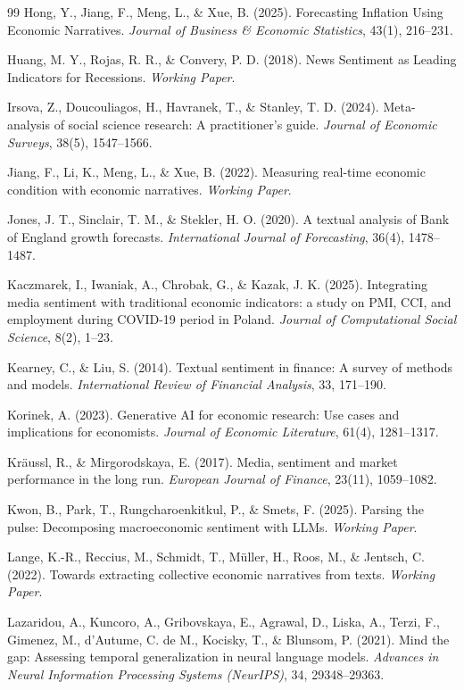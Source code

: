 \documentclass[11pt,twocolumn]{article}
\begin{document}
\begin{thebibliography}{99}
 Hong, Y., Jiang, F., Meng, L., \& Xue, B. (2025). Forecasting Inflation Using Economic Narratives. \textit{Journal of Business \& Economic Statistics}, 43(1), 216--231.

 Huang, M. Y., Rojas, R. R., \& Convery, P. D. (2018). News Sentiment as Leading Indicators for Recessions. \textit{Working Paper}.

 Irsova, Z., Doucouliagos, H., Havranek, T., \& Stanley, T. D. (2024). Meta-analysis of social science research: A practitioner's guide. \textit{Journal of Economic Surveys}, 38(5), 1547--1566.

 Jiang, F., Li, K., Meng, L., \& Xue, B. (2022). Measuring real-time economic condition with economic narratives. \textit{Working Paper}.

 Jones, J. T., Sinclair, T. M., \& Stekler, H. O. (2020). A textual analysis of Bank of England growth forecasts. \textit{International Journal of Forecasting}, 36(4), 1478--1487.

 Kaczmarek, I., Iwaniak, A., Chrobak, G., \& Kazak, J. K. (2025). Integrating media sentiment with traditional economic indicators: a study on PMI, CCI, and employment during COVID-19 period in Poland. \textit{Journal of Computational Social Science}, 8(2), 1--23.

 Kearney, C., \& Liu, S. (2014). Textual sentiment in finance: A survey of methods and models. \textit{International Review of Financial Analysis}, 33, 171--190.

 Korinek, A. (2023). Generative AI for economic research: Use cases and implications for economists. \textit{Journal of Economic Literature}, 61(4), 1281--1317.

 Kr\"aussl, R., \& Mirgorodskaya, E. (2017). Media, sentiment and market performance in the long run. \textit{European Journal of Finance}, 23(11), 1059--1082.

 Kwon, B., Park, T., Rungcharoenkitkul, P., \& Smets, F. (2025). Parsing the pulse: Decomposing macroeconomic sentiment with LLMs. \textit{Working Paper}.

 Lange, K.-R., Reccius, M., Schmidt, T., M\"uller, H., Roos, M., \& Jentsch, C. (2022). Towards extracting collective economic narratives from texts. \textit{Working Paper}.

 Lazaridou, A., Kuncoro, A., Gribovskaya, E., Agrawal, D., Liska, A., Terzi, F., Gimenez, M., d'Autume, C. de M., Kocisky, T., \& Blunsom, P. (2021). Mind the gap: Assessing temporal generalization in neural language models. \textit{Advances in Neural Information Processing Systems (NeurIPS)}, 34, 29348--29363.


\end{thebibliography}
\end{document}
